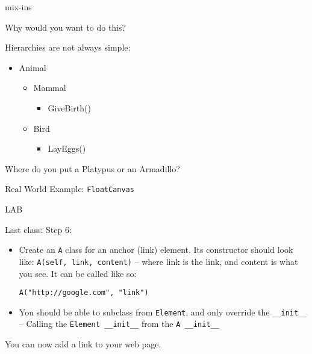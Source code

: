 \documentclass{beamer}
\begin{document}
\begin{frame}[fragile]{mix-ins}

{\Large Why would you want to do this?}

\vfill
{\Large Hierarchies are not always simple:}
\vfill
\begin{itemize}
  \item Animal
  \begin{itemize}
    \item Mammal
    \begin{itemize}
      \item GiveBirth()
    \end{itemize}
    \item Bird
    \begin{itemize}
      \item LayEggs()
    \end{itemize}
  \end{itemize}
\end{itemize}
\vfill
{\Large Where do you put a Platypus or an Armadillo?}

\vfill
{\Large Real World Example: \verb|FloatCanvas|}
\end{frame} 

\begin{frame}[fragile]{LAB}

{\Large Last class: Step 6:}

\begin{itemize}
   \item  Create an \verb|A| class for an anchor (link) element. Its constructor should
          look like: \verb|A(self, link, content)| -- where link is the link,
          and content is what you see. It can be called like so:

   \verb|A("http://google.com", "link")|

  \item You should be able to subclass from \verb|Element|, and only override
        the \verb|__init__|\\
        -- Calling the \verb|Element __init__| from the  \verb|A __init__|
\end{itemize}

\vfill
    You can now add a link to your web page.
\end{frame}
\end{document}
